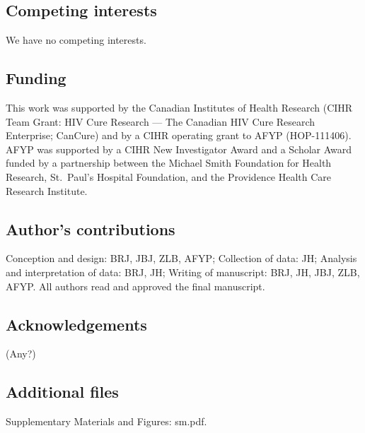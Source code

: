 \documentclass[12pt]{article}
\begin{document}
\subsection*{Competing interests}
We have no competing interests.

\subsection*{Funding}
This work was supported by the Canadian Institutes of Health Research (CIHR Team Grant: HIV Cure Research --- The Canadian HIV Cure Research Enterprise; CanCure) and by a CIHR operating grant to AFYP (HOP-111406).
AFYP was supported by a CIHR New Investigator Award and a Scholar Award funded by a partnership between the Michael Smith Foundation for Health Research, St.~Paul's Hospital Foundation, and the Providence Health Care Research Institute.


\subsection*{Author's contributions}
Conception and design: BRJ, JBJ, ZLB, AFYP; Collection of data: JH; Analysis and interpretation of data: BRJ, JH; Writing of manuscript: BRJ, JH, JBJ, ZLB, AFYP. All authors read and approved the final manuscript.

\subsection*{Acknowledgements}
(Any?)

\subsection*{Additional files}
Supplementary Materials and Figures: sm.pdf.








\end{document}
